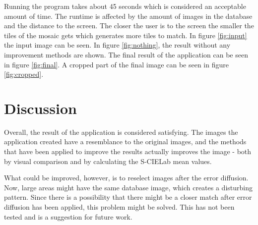 \documentclass[conference]{IEEEtran}
\begin{document}
Running the program takes about 45 seconds which is considered an acceptable amount of time. The runtime is affected by the amount of images in the database and the distance to the screen. The closer the user is to the screen the smaller the tiles of the mosaic gets which generates more tiles to match. In figure \ref{fig:input} the input image can be seen. In figure \ref{fig:nothing}, the result without any improvement methods are shown. The final result of the application can be seen in figure \ref{fig:final}. A cropped part of the final image can be seen in figure \ref{fig:cropped}.

\section{Discussion}

Overall, the result of the application is considered satisfying. The images the application created have a resemblance to the original images, and the methods that have been applied to improve the results actually improves the image - both by visual comparison and by calculating the S-CIELab mean values.

What could be improved, however, is to reselect images after the error diffusion. Now, large areas might have the same database image, which creates a disturbing pattern. Since there is a possibility that there might be a closer match after error diffusion has been applied, this problem might be solved. This has not been tested and is a suggestion for future work.






\end{document}
